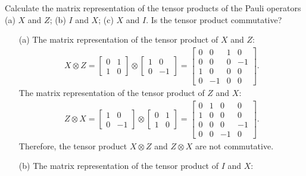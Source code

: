 \documentclass[en]{sol-man}
\begin{document}
\begin{exe}
    Calculate the matrix representation of the tensor products of the Pauli operators (a) $X$ and $Z$; (b) $I$ and $X$; (c) $X$ and $I$. Is the tensor product commutative?
\end{exe}
\begin{sol}
    \begin{itemize}
        \item[(a)] The matrix representation of the tensor product of $X$ and $Z$:
        \begin{align}
            X\otimes Z=\begin{bmatrix}
                0&1\\
                1&0
            \end{bmatrix}\otimes\begin{bmatrix}
                1&0\\
                0&-1
            \end{bmatrix}=\begin{bmatrix}
                0&0&1&0\\
                0&0&0&-1\\
                1&0&0&0\\
                0&-1&0&0
            \end{bmatrix}.
        \end{align}
        The matrix representation of the tensor product of $Z$ and $X$:
        \begin{align}
            Z\otimes X=\begin{bmatrix}
                1&0\\
                0&-1
            \end{bmatrix}\otimes\begin{bmatrix}
                0&1\\
                1&0
            \end{bmatrix}=\begin{bmatrix}
                0&1&0&0\\
                1&0&0&0\\
                0&0&0&-1\\
                0&0&-1&0
            \end{bmatrix}.
        \end{align}
        Therefore, the tensor product $X\otimes Z$ and $Z\otimes X$ are not commutative.
        \item[(b)] The matrix representation of the tensor product of $I$ and $X$:

\end{itemize}
\end{sol}
\end{document}
